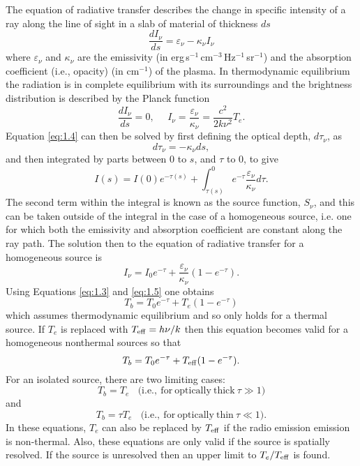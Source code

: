 The equation of radiative transfer describes the change in specific intensity of a ray along the line of sight in a slab of material of thickness $ds$
\begin{equation}\label{eq:1.4}
\frac{dI_{\nu}}{ds}=\varepsilon _{\nu} - \kappa _{\nu}I_{\nu}
\end{equation}
where $\varepsilon _{\nu}$ and $\kappa _{\nu}$ are the emissivity (in erg\,s$^{-1}$\,cm$^{-3}$\,Hz$^{-1}$\,sr$^{-1}$) and the absorption coefficient (i.e., opacity) (in cm$^{-1}$) of the plasma. In thermodynamic equilibrium the radiation is in complete equilibrium with its surroundings and the brightness distribution is described by the Planck function
\begin{equation}\label{eq:1.5}
\dfrac{dI_{\nu}}{ds}=0, \ \ \ \ \ \ I_{\nu}= \frac{\varepsilon _{\nu}}{\kappa _{\nu}}=\frac{c^2}{2k\nu ^2}T_{e}.
\end{equation}
Equation \ref{eq:1.4} can then be solved by first defining the optical depth, $d\tau _{\nu}$, as
\begin{equation}
d\tau _{\nu}=-\kappa _{\nu}ds,
\end{equation}
and then integrated by parts between 0 to $s$, and $\tau$ to 0, to give 
\begin{equation}
I(s) = I(0)e^{-\tau(s)} + \int ^0 _{\tau (s)}e^{-\tau} \frac{\varepsilon _{\nu}}{\kappa _{\nu}}d\tau.
\end{equation}
The second term within the integral is known as the source function, $S_{\nu}$, and this can be taken outside of the integral in the case of a homogeneous source, i.e. one for which both the emissivity and absorption coefficient are constant along the ray path. The solution then to the equation of radiative transfer for a homogeneous source is
\begin{equation}
I_{\nu} = I_{0}e^{-\tau} + \frac{\varepsilon _{\nu}}{\kappa _{\nu}}(1 - e^{-\tau}).
\end{equation}
Using Equations \ref{eq:1.3} and \ref{eq:1.5} one obtains
\begin{equation}
T_{b} = T_{0}e^{-\tau} + T_{e}(1 - e^{-\tau})
\end{equation}
which assumes thermodynamic equilibrium and so only holds for a thermal source. If $T_{e}$ is replaced with $T_{\rm{eff}} = h\nu/k$  then this equation becomes valid for a homogeneous nonthermal sources so that
\begin{equation}
T_{b} = T_{0}e^{-\tau} + T_{\rm{eff}}(1 - e^{-\tau}).
\end{equation}
For an isolated source, there are two limiting cases:
\begin{equation}\label{eq:1.11}
T_{b} = T_{e} \ \ \ \ \mathrm{(i.e.,\ for\ optically\ thick}\ \tau \gg 1)
\end{equation}
and
\begin{equation}\label{eq:1.12}
T_{b} = \tau T_{e} \ \ \ \ \mathrm{(i.e.,\ for\ optically\ thin}\ \tau \ll 1).
\end{equation}
In these equations, $T_{e}$ can also be replaced by $T_{\rm{eff}}$ if the radio emission emission is non-thermal. Also, these equations are only valid if the source is spatially resolved. If the source is unresolved then an upper limit to $T_{e}/T_{\rm{eff}}$ is found.


